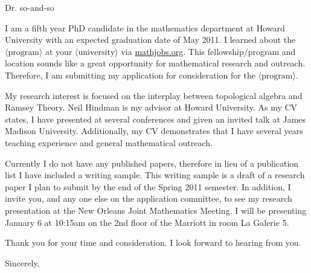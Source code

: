 \documentclass[12pt]{letter}
\newcommand{\la}{\langle}
\newcommand{\ra}{\rangle}
\begin{document}
\begin{letter}{}
\opening{Dr. so-and-so}

I am a fifth year PhD candidate in the mathematics department at
Howard University with an expected graduation date of May 2011.  
I learned about the $\la\mbox{program}\ra$ at your
$\la\mbox{university}\ra$ via \url{mathjobs.org}. 
This fellowship/program  and location sounds like a great opportunity
for mathematical research and outreach. 
Therefore, I am submitting my application for consideration for the 
$\la\mbox{program}\ra$.

My research interest is focused on the interplay between topological
algebra and Ramsey Theory. 
Neil Hindman is my advisor at Howard University. 
As my CV states, I have presented at several conferences and given an
invited talk at James Madison University. 
Additionally, my CV demonstrates that I have several years teaching
experience and general mathematical outreach. 

Currently I do not have any published papers, therefore in lieu of  
a publication list I have included a writing sample.
This writing sample is a draft of a research paper I plan to submit by
the end of the Spring 2011 semester.
In addition, I invite you, and any one else on the application
committee, to see my research presentation at the New Orleans Joint
Mathematics Meeting.
I will be presenting January 6 at 10:15am on the 2nd floor of the
Marriott in room La Galerie 5. 

Thank you for your time and consideration. 
I look forward to hearing from you. 
\closing{Sincerely,}
 

\end{letter}
\end{document}
